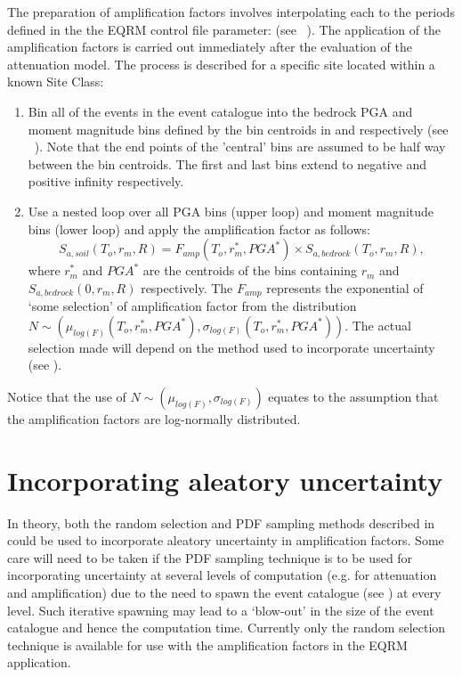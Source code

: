 The preparation of amplification factors involves interpolating each
to the periods defined in the the EQRM control file parameter:
 (see ~). The
application of the amplification factors is carried out immediately
after the evaluation of the attenuation model. The process is
described for a specific site located within a known Site Class:
\begin{enumerate}
\item Bin all of the events in the event catalogue into the
bedrock PGA and moment magnitude bins defined by the bin centroids
in  and 
respectively (see ~). Note that the
end points of the 'central' bins are assumed to be half way between
the bin centroids. The first and last bins extend to negative and
positive infinity respectively.
\item Use a nested loop over all PGA bins (upper loop) and moment
magnitude bins (lower loop) and apply the amplification factor as
follows:
\begin{equation}
S_{a,soil}(T_o,r_m,R)= F_{amp}(T_o,r_m^*,PGA^*) \times
S_{a,bedrock}(T_o,r_m,R),
\end{equation}
where $r_m^*$ and $PGA^*$ are the centroids of the bins containing
$r_m$ and \newline $S_{a,bedrock}(0,r_m,R)$ respectively. The
$F_{amp}$ represents the exponential of `some selection' of
amplification factor from the distribution \newline \mbox{$N \sim
(\mu_{log(F)}(T_o,r_m^*,PGA^*),\sigma_{log(F)}(T_o,r_m^*,PGA^*))$}.
The actual selection  made will depend on the method used to
incorporate uncertainty (see ).
\end{enumerate}
Notice that the use of $N \sim (\mu_{log(F)},\sigma_{log(F)})$
equates to the assumption that the amplification factors are
log-normally distributed.

\section{Incorporating aleatory uncertainty}
\label{sec:regolith-incorp-unc}


In theory, both the random selection and PDF sampling methods
described in  could be used to incorporate
aleatory uncertainty in amplification factors. Some care will need
to be taken if the PDF sampling technique is to be used for
incorporating uncertainty at several levels  of computation (e.g.
for attenuation and amplification) due to the need to spawn the
event catalogue (see ) at every level. Such
iterative spawning may lead to a `blow-out' in the size of the event
catalogue and hence the computation time. Currently only the random
selection technique is available for use with the amplification
factors in the EQRM application.

